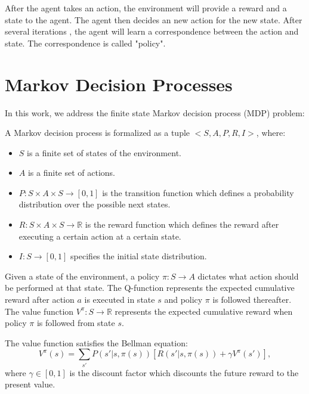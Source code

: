 After the agent takes an action, the environment will provide a reward and a state to the
agent. The agent then decides an new action for the new state. After several iterations
, the agent will learn a correspondence between the action and state. The correspondence is called 
"policy". 

\section{Markov Decision Processes}
\label{se:MDP}
In this work, we address the finite state Markov decision process (MDP) problem:
\begin{definition} A Markov decision process is formalized as a tuple $<S, A, P, R, I>$, where:
\begin{itemize}
    \item $S$ is a finite set of states of the environment.
    \item $A$ is a finite set of actions.
    \item $P:S \times A \times S \rightarrow [0, 1]$ is the transition function which defines a probability distribution over the possible next states.
    \item $R:S \times A \times S \rightarrow \mathbb{R}$ is the reward function which defines the reward after executing a certain action at a certain state.
    \item $I:S \rightarrow [0, 1]$ specifies the initial state distribution.
 \end{itemize}
\end{definition}

Given a state of the environment, a policy $\pi: S \rightarrow A$ dictates what action should be performed at that state. 
The Q-function represents the expected cumulative reward after action $a$ is executed in state $s$ and 
policy $\pi$ is followed thereafter.
The value function $V^{\pi}: S \rightarrow \mathbb{R}$ represents the expected cumulative reward when 
policy $\pi$ is followed from state $s$.

The value function satisfies the Bellman equation:
\begin{equation}
    V^{\pi}(s) = \sum_{s'}P(s'|s, \pi(s))[R(s'|s, \pi(s)) + \gamma V^{\pi}(s')],
    \label{eq:V}
\end{equation}
where $\gamma \in [0, 1]$ is the discount factor which discounts the future reward to the present value.

